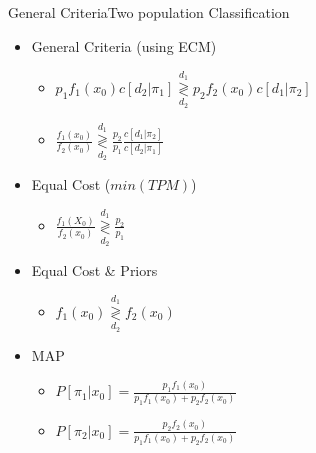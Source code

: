 \documentclass[aspectratio=169,10pt,t]{beamer}
\newcommand\gldec[2]{
	\underset{#2}{\overset{#1}{\gtrless}}
}
\begin{document}
\begin{frame}{General Criteria}{Two population Classification}
	\begin{itemize}
        \item General Criteria (using ECM)
        \begin{itemize}
					\item $ p_1 f_1(x_0) c[d_2 | \pi_1] \gldec{d_1}{d_2} p_2 f_2(x_0) c[d_1 | \pi_2]$
            \item $ \frac{f_1(x_0)}{f_2(x_0)} \gldec{d_1}{d_2} \frac{p_2}{p_1} \frac{c[d_1 | \pi_2]}{c[d_2 | \pi_1]}$
        \end{itemize}
				\pause
        \item Equal Cost ($min(TPM)$)
        \begin{itemize}
            \item $ \frac{f_1(X_0)}{f_2(x_0)}  \gldec{d_1}{d_2} \frac{p_2}{p_1}$
        \end{itemize}
				\pause
        \item Equal Cost \& Priors
        \begin{itemize}
            \item $ f_1(x_0)  \gldec{d_1}{d_2} f_2(x_0)$
        \end{itemize}
				\pause
        \item MAP
        \begin{itemize}
            \item $P[\pi_1 | x_0 ] = \frac{p_1 f_1(x_0)}{p_1 f_1(x_0) + p_2 f_2(x_0)}$
            \item $P[\pi_2 | x_0 ] = \frac{p_2 f_2(x_0)}{p_1 f_1(x_0) + p_2 f_2(x_0)}$
        \end{itemize}
			\end{itemize}
\end{frame}
\end{document}
